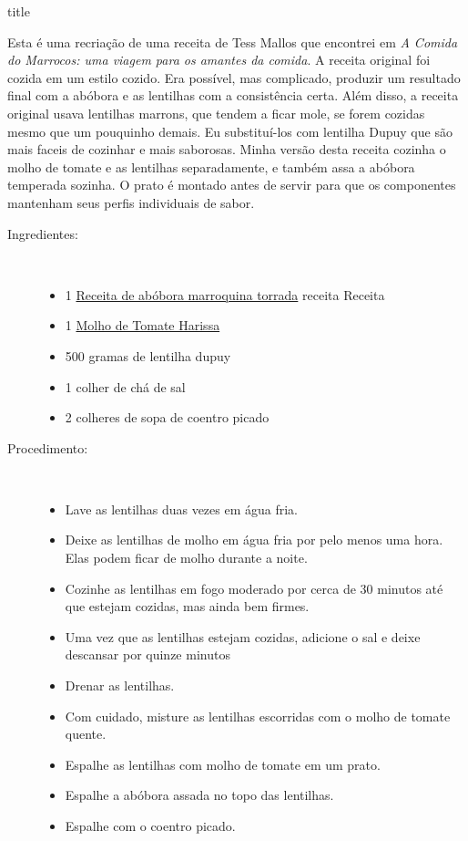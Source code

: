 \documentclass [11pt, papel de carta] {article}
\begin{document}
 {title}

Esta é uma recriação de uma receita de Tess Mallos que encontrei em {\it A Comida do Marrocos: uma viagem para os amantes da comida}. A receita original foi cozida em um estilo cozido. Era possível, mas complicado, produzir um resultado final com a abóbora e as lentilhas com a consistência certa. Além disso, a receita original usava lentilhas marrons, que tendem a ficar mole, se forem cozidas mesmo que um pouquinho demais. Eu substituí-los com lentilha Dupuy que são mais faceis de cozinhar e mais saborosas. Minha versão desta receita cozinha o molho de tomate e as lentilhas separadamente, e também assa a abóbora temperada sozinha. O prato é montado antes de servir para que os componentes mantenham seus perfis individuais de sabor.

\begin {description}

\item [Ingredientes:] \ \\
\begin {itemize}
\item 1 \href {MoroccanRoastedButternutSquash.html} {Receita de abóbora marroquina torrada} receita
Receita \item 1 \href {HarissaTomatoSauce.html} {Molho de Tomate Harissa}
\item 500 gramas de lentilha dupuy
\item 1 colher de chá de sal
\item 2 colheres de sopa de coentro picado
\end {itemize}


\item [Procedimento:] \ \\
\begin {itemize}
\item Lave as lentilhas duas vezes em água fria.
\item Deixe as lentilhas de molho em água fria por pelo menos uma hora. Elas podem ficar de molho durante a noite.
\item Cozinhe as lentilhas em fogo moderado por cerca de 30 minutos até que estejam cozidas, mas ainda bem firmes.
\item Uma vez que as lentilhas estejam cozidas, adicione o sal e deixe descansar por quinze minutos
\item Drenar as lentilhas.
\item Com cuidado, misture as lentilhas escorridas com o molho de tomate quente.
\item Espalhe as lentilhas com molho de tomate em um prato.
\item Espalhe a abóbora assada no topo das lentilhas.
\item Espalhe com o coentro picado.
\end {itemize}
\end {description}
\end{document}
